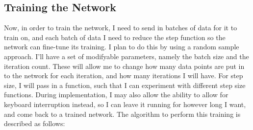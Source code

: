 \documentclass[10pt]{article}
\begin{document}
\subsection{Training the Network}
Now, in order to train the network, I need to send in batches of data for it to train on, and each batch of data I need to reduce the step function so the network can fine-tune its training. I plan to do this by using a random sample approach. I'll have a set of modifyable parameters, namely the batch size and the iteration count. These will allow me to change how many data points are put in to the network for each iteration, and how many iterations I will have. For step size, I will pass in a function, such that I can experiment with different step size functions. During implementation, I may also allow the ability to allow for keyboard interruption instead, so I can leave it running for however long I want, and come back to a trained network. The algorithm to perform this training is described as follows:\newline
\end{document}
